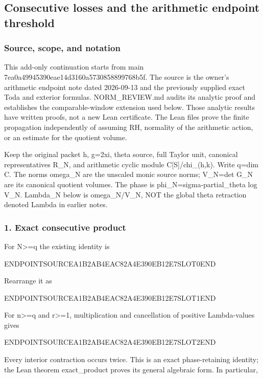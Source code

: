 \subsection{Consecutive losses and the arithmetic endpoint threshold}\label{endpoint-pr25_consecutive_original--consecutive-losses-and-the-arithmetic-endpoint-threshold}

\subsubsection{Source, scope, and notation}\label{endpoint-pr25_consecutive_original--source-scope-and-notation}

This add-only continuation starts from main 7ea0a49945390eae14d3160a5730858899768b5f. The source is the owner's arithmetic endpoint note dated 2026-09-13 and the previously supplied exact Toda and exterior formulas. NORM\_REVIEW.md audits its analytic proof and establishes the comparable-window extension used below. Those analytic results have written proofs, not a new Lean certificate. The Lean files prove the finite propagation independently of assuming RH, normality of the arithmetic action, or an estimate for the quotient volume.

Keep the original packet h, g=2xi, theta source, full Taylor unit, canonical representatives R\_N, and arithmetic cyclic module C{[}S{]}/chi\_(h,k). Write q=dim C. The norms omega\_N are the unscaled monic source norms; V\_N=det G\_N are its canonical quotient volumes. The phase is phi\_N=sigma-partial\_theta log V\_N. Lambda\_N below is omega\_N/V\_N, NOT the global theta retraction denoted Lambda in earlier notes.

\subsubsection{1. Exact consecutive product}\label{endpoint-pr25_consecutive_original--exact-consecutive-product}

For N\textgreater=q the existing identity is

ENDPOINTSOURCEA1B2AB4EAC82A4E390EB12E7SLOT0END

Rearrange it as

ENDPOINTSOURCEA1B2AB4EAC82A4E390EB12E7SLOT1END

For n\textgreater=q and r\textgreater=1, multiplication and cancellation of positive Lambda-values gives

ENDPOINTSOURCEA1B2AB4EAC82A4E390EB12E7SLOT2END

Every interior contraction occurs twice. This is an exact phase-retaining identity; the Lean theorem exact\_product proves its general algebraic form. In particular,

